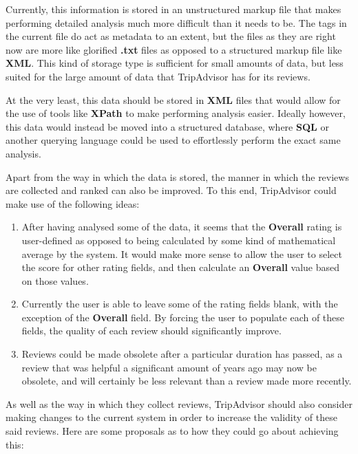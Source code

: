 \documentclass{article}
\begin{document}
	\noindent
	Currently, this information is stored in an unstructured markup file that makes performing detailed analysis much more difficult than it needs to be. The tags in the current file do act as metadata to an extent, but the files as they are right now are more like glorified \textbf{.txt} files as opposed to a structured markup file like \textbf{XML}. This kind of storage type is sufficient for small amounts of data, but less suited for the large amount of data that TripAdvisor has for its reviews. \newline
	
	\noindent
	At the very least, this data should be stored in \textbf{XML} files that would allow for the use of tools like \textbf{XPath} to make performing analysis easier. Ideally however, this data would instead be moved into a structured database, where \textbf{SQL} or another querying language could be used to effortlessly perform the exact same analysis. \newline
	
	\noindent
	Apart from the way in which the data is stored, the manner in which the reviews are collected and ranked can also be improved. To this end, TripAdvisor could make use of the following ideas:
	
	\begin{enumerate}
		\item After having analysed some of the data, it seems that the \textbf{Overall} rating is user-defined as opposed to being calculated by some kind of mathematical average by the system. It would make more sense to allow the user to select the score for other rating fields, and then calculate an \textbf{Overall} value based on those values.
		\item Currently the user is able to leave some of the rating fields blank, with the exception of the \textbf{Overall} field. By forcing the user to populate each of these fields, the quality of each review should significantly improve.
		\item Reviews could be made obsolete after a particular duration has passed, as a review that was helpful a significant amount of years ago may now be obsolete, and will certainly be less relevant than a review made more recently.
	\end{enumerate}

	\newpage
	\noindent
	As well as the way in which they collect reviews, TripAdvisor should also consider making changes to the current system in order to increase the validity of these said reviews. Here are some proposals as to how they could go about achieving this:
	
\end{document}

